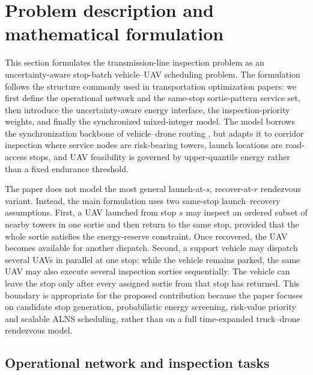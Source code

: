 ﻿\section{Problem description and mathematical formulation}
\label{sec:model}

This section formulates the transmission-line inspection problem as an uncertainty-aware stop-batch vehicle--UAV scheduling problem. The formulation follows the structure commonly used in transportation optimization papers: we first define the operational network and the same-stop sortie-pattern service set, then introduce the uncertainty-aware energy interface, the inspection-priority weights, and finally the synchronized mixed-integer model. The model borrows the synchronization backbone of vehicle--drone routing \citep{murray2015flying,agatz2018tspdrone,wang2019vrpd}, but adapts it to corridor inspection where service nodes are risk-bearing towers, launch locations are road-access stops, and UAV feasibility is governed by upper-quantile energy rather than a fixed endurance threshold.

The paper does not model the most general launch-at-\(s\), recover-at-\(r\) rendezvous variant. Instead, the main formulation uses two same-stop launch--recovery assumptions. First, a UAV launched from stop \(s\) may inspect an ordered subset of nearby towers in one sortie and then return to the same stop, provided that the whole sortie satisfies the energy-reserve constraint. Once recovered, the UAV becomes available for another dispatch. Second, a support vehicle may dispatch several UAVs in parallel at one stop; while the vehicle remains parked, the same UAV may also execute several inspection sorties sequentially. The vehicle can leave the stop only after every assigned sortie from that stop has returned. This boundary is appropriate for the proposed contribution because the paper focuses on candidate stop generation, probabilistic energy screening, risk-value priority and scalable ALNS scheduling, rather than on a full time-expanded truck--drone rendezvous model.

\subsection{Operational network and inspection tasks}
\label{sec:model-setting}

